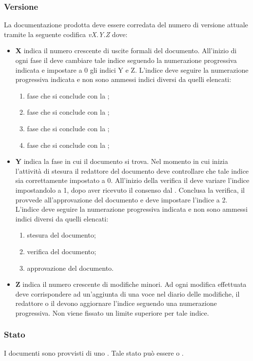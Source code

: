 \documentclass[12pt,a4paper]{article}
\begin{document}
\subsubsection{Versione} \label{Versione}
La documentazione prodotta deve essere corredata del numero di versione attuale tramite la seguente codifica \emph{vX.Y.Z} dove:
\begin{itemize}
  \item \textbf{X} indica il numero crescente di uscite formali del documento. All'inizio di ogni fase il \PM deve cambiare tale indice seguendo la numerazione progressiva indicata e impostare a 0 gli indici Y e Z. L'indice deve seguire la numerazione progressiva indicata e non sono ammessi indici diversi da quelli elencati:
  \begin{enumerate}
    \item fase che si conclude con la \RR;
    \item fase che si conclude con la \RP;
    \item fase che si conclude con la \RQ;
    \item fase che si conclude con la \RA;
  \end{enumerate}
  \item \textbf{Y} indica la fase in cui il documento si trova. Nel momento in cui inizia l'attività di stesura il redattore del documento deve controllare che tale indice sia correttamente impostato a 0. All'inizio della verifica il \VR{} deve variare l'indice impostandolo a 1, dopo aver ricevuto il consenso dal \PM. Conclusa la verifica, il \PM{} provvede all'approvazione del documento e deve impostare l'indice a 2. L'indice deve seguire la numerazione progressiva indicata e non sono ammessi indici diversi da quelli elencati:
  \begin{enumerate}[start=0]
    \item stesura del documento;
    \item verifica del documento;
    \item approvazione del documento.
  \end{enumerate}
  \item \textbf{Z} indica il numero crescente di modifiche minori. Ad ogni modifica effettuata deve corrispondere ad un'aggiunta di una voce nel diario delle modifiche, il redattore o il \VR devono aggiornare l'indice seguendo una numerazione progressiva. Non viene fissato un limite superiore per tale indice.
\end{itemize}

\subsubsection{Stato}
I documenti sono provvisti di uno . Tale stato può essere  o  .
\end{document}
